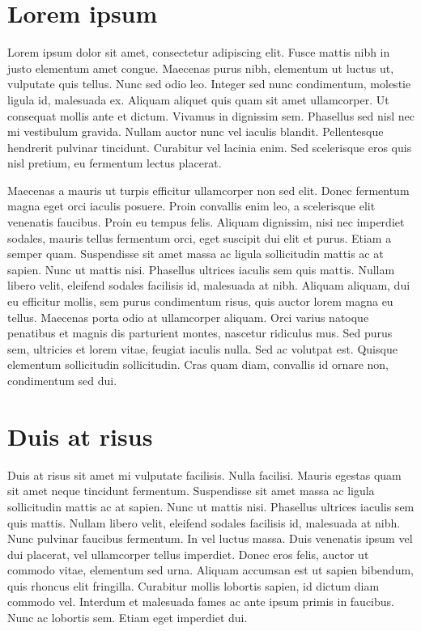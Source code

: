 \documentclass{article}
\begin{document}
\section{Lorem ipsum}

Lorem ipsum dolor sit amet, consectetur adipiscing elit.
Fusce mattis nibh in justo elementum amet congue.
Maecenas purus nibh, elementum ut luctus ut, vulputate quis tellus.
Nunc sed odio leo.
Integer sed nunc condimentum, molestie ligula id, malesuada ex.
Aliquam aliquet quis quam sit amet ullamcorper.
Ut consequat mollis ante et dictum.
Vivamus in dignissim sem.
Phasellus sed nisl nec mi vestibulum gravida.
Nullam auctor nunc vel iaculis blandit.
Pellentesque hendrerit pulvinar tincidunt.
Curabitur vel lacinia enim.
Sed scelerisque eros quis nisl pretium, eu fermentum lectus placerat.

Maecenas a mauris ut turpis efficitur ullamcorper non sed elit.
Donec fermentum magna eget orci iaculis posuere.
Proin convallis enim leo, a scelerisque elit venenatis faucibus.
Proin eu tempus felis.
Aliquam dignissim, nisi nec imperdiet sodales, mauris tellus fermentum orci, eget suscipit dui elit et purus.
Etiam a semper quam.
Suspendisse sit amet massa ac ligula sollicitudin mattis ac at sapien.
Nunc ut mattis nisi.
Phasellus ultrices iaculis sem quis mattis.
Nullam libero velit, eleifend sodales facilisis id, malesuada at nibh.
Aliquam aliquam, dui eu efficitur mollis, sem purus condimentum risus, quis auctor lorem magna eu tellus.
Maecenas porta odio at ullamcorper aliquam.
Orci varius natoque penatibus et magnis dis parturient montes, nascetur ridiculus mus.
Sed purus sem, ultricies et lorem vitae, feugiat iaculis nulla.
Sed ac volutpat est.
Quisque elementum sollicitudin sollicitudin.
Cras quam diam, convallis id ornare non, condimentum sed dui.

\section{Duis at risus}

Duis at risus sit amet mi vulputate facilisis.
Nulla facilisi.
Mauris egestas quam sit amet neque tincidunt fermentum.
Suspendisse sit amet massa ac ligula sollicitudin mattis ac at sapien.
Nunc ut mattis nisi.
Phasellus ultrices iaculis sem quis mattis.
Nullam libero velit, eleifend sodales facilisis id, malesuada at nibh.
Nunc pulvinar faucibus fermentum.
In vel luctus massa.
Duis venenatis ipsum vel dui placerat, vel ullamcorper tellus imperdiet.
Donec eros felis, auctor ut commodo vitae, elementum sed urna.
Aliquam accumsan est ut sapien bibendum, quis rhoncus elit fringilla.
Curabitur mollis lobortis sapien, id dictum diam commodo vel.
Interdum et malesuada fames ac ante ipsum primis in faucibus.
Nunc ac lobortis sem.
Etiam eget imperdiet dui.
\end{document}
